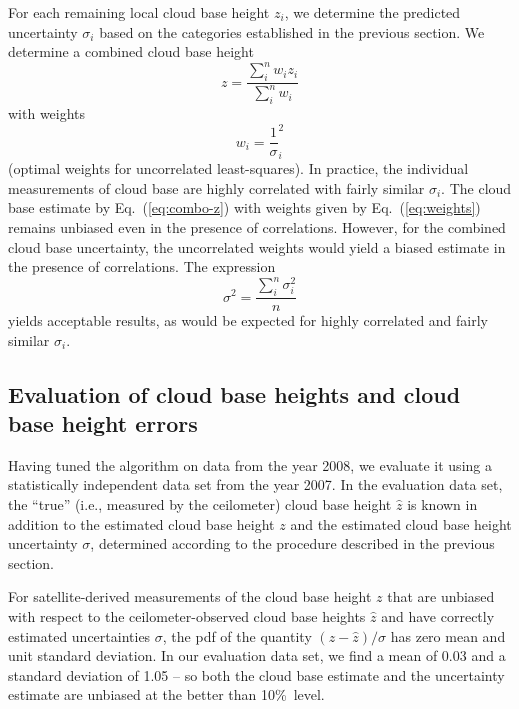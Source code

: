 \documentclass[amt,manuscript]{copernicus}\usepackage[]{graphicx}\usepackage[]{color}
\begin{document}
For each remaining local cloud base height $z_i$, we determine the predicted
uncertainty $\sigma_i$ based on the categories established in the previous
section.  We determine a combined cloud base height
\begin{equation}
  \label{eq:combo-z}
  z = \frac{\sum\limits_i^n w_i z_i}{\sum\limits_i^n w_i}
\end{equation}
with weights
\begin{equation}
  \label{eq:weights}
  w_i = \frac 1 \sigma_i^2
\end{equation}
(optimal weights for uncorrelated least-squares).  In practice, the individual
measurements of cloud base are highly correlated with fairly similar
$\sigma_i$.  The cloud base estimate by Eq.~(\ref{eq:combo-z}) with weights
given by Eq.~(\ref{eq:weights}) remains unbiased even in the presence of
correlations.  However, for the combined cloud base uncertainty,
the uncorrelated weights would yield a biased estimate in the presence of
correlations.  The expression
\begin{equation}
  \label{eq:combo-sigma}
  \sigma^2 = \frac{\sum\limits_i^n \sigma_i^2}{n}
\end{equation}
yields acceptable results, as would be expected for highly correlated and fairly
similar $\sigma_i$.

\subsection{Evaluation of cloud base heights and cloud base height errors}
\label{sec:algorithm:eval}




Having tuned the algorithm on data from the year 2008, we evaluate it using a
statistically independent data set from the year 2007.  In the evaluation data
set, the ``true'' (i.e., measured by the ceilometer) cloud base height $\hat{z}$
is known in addition to the estimated cloud base height $z$ and the estimated
cloud base height uncertainty $\sigma$, determined according to the procedure
described in the previous section.

For satellite-derived measurements of the cloud base height $z$ that are
unbiased with respect to the ceilometer-observed cloud base heights $\hat{z}$
and have correctly estimated uncertainties $\sigma$, the pdf of the quantity
$(z - \hat{z})/\sigma$ has zero mean and unit standard deviation. In our
evaluation data set, we find a mean of 0.03 and a standard deviation of 1.05 -- so both the cloud base estimate and
the uncertainty estimate are unbiased at the better than 10\%\ level.
\end{document}
